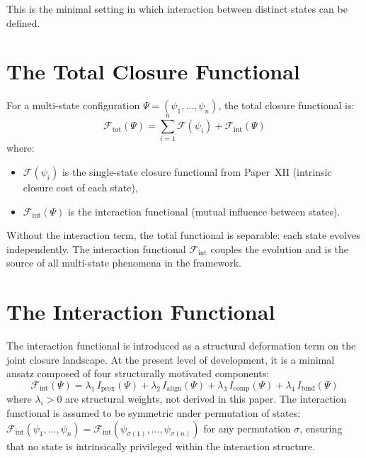 \documentclass[12pt]{article}
\newcommand{\Fcal}{\mathcal{F}}
\newcommand{\Fint}{\Fcal_{\mathrm{int}}}
\newcommand{\Ftot}{\Fcal_{\mathrm{tot}}}
\begin{document}
This is the minimal setting in which interaction between distinct states can be defined.

\section{The Total Closure Functional}\label{sec:total}

For a multi-state configuration $\Psi = (\psi_1, \ldots, \psi_n)$, the total closure functional is:
\begin{equation}\label{eq:Ftotal}
    \Ftot(\Psi) = \sum_{i=1}^n \Fcal(\psi_i) + \Fint(\Psi)
\end{equation}
where:
\begin{itemize}
    \item $\Fcal(\psi_i)$ is the single-state closure functional from Paper~XII (intrinsic closure cost of each state),
    \item $\Fint(\Psi)$ is the interaction functional (mutual influence between states).
\end{itemize}

Without the interaction term, the total functional is separable: each state evolves independently. The interaction functional $\Fint$ couples the evolution and is the source of all multi-state phenomena in the framework.

\section{The Interaction Functional}\label{sec:interaction}

The interaction functional is introduced as a structural deformation term on the joint closure landscape. At the present level of development, it is a minimal ansatz composed of four structurally motivated components:
\begin{equation}\label{eq:Fint}
    \Fint(\Psi) = \lambda_1\, I_{\mathrm{prox}}(\Psi) + \lambda_2\, I_{\mathrm{align}}(\Psi) + \lambda_3\, I_{\mathrm{comp}}(\Psi) + \lambda_4\, I_{\mathrm{bind}}(\Psi)
\end{equation}
where $\lambda_i > 0$ are structural weights, not derived in this paper. The interaction functional is assumed to be symmetric under permutation of states: $\Fint(\psi_1, \ldots, \psi_n) = \Fint(\psi_{\sigma(1)}, \ldots, \psi_{\sigma(n)})$ for any permutation $\sigma$, ensuring that no state is intrinsically privileged within the interaction structure.
\end{document}
